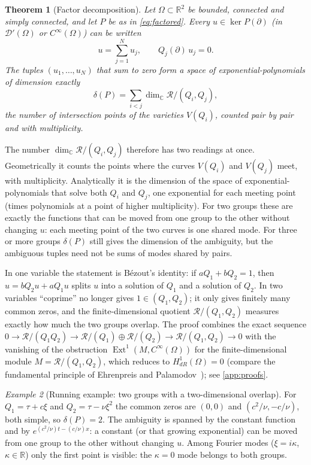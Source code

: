 \documentclass[11pt]{article}
\theoremstyle{plain}
\newtheorem{theorem}{Theorem}[section]
\theoremstyle{definition}
\theoremstyle{remark}
\newtheorem{example}[theorem]{Example}
\newcommand{\R}{\mathbb{R}}
\newcommand{\C}{\mathbb{C}}
\newcommand{\ring}{\mathcal{R}}            %
\newcommand{\Var}{V}                        %
\newcommand{\deltaP}{\delta(P)}             %
\begin{document}
\begin{theorem}[Factor decomposition]\label{thm:factor}
Let $\Omega\subset\R^2$ be bounded, connected and simply connected, and let $P$ be as in
\eqref{eq:factored}. Every $u\in\ker P(\partial)$ (in $\mathcal D'(\Omega)$ or $C^\infty(\Omega)$) can be
written
\begin{equation}\label{eq:decomp}
  u=\sum_{j=1}^N u_j,\qquad Q_j(\partial)\,u_j=0 .
\end{equation}
The tuples $(u_1,\dots,u_N)$ that sum to zero form a space of exponential-polynomials of dimension
exactly
\begin{equation}\label{eq:deltaP}
  \deltaP=\sum_{i<j}\dim_\C\ring/(Q_i,Q_j),
\end{equation}
the number of intersection points of the varieties $\Var(Q_i)$, counted pair by pair and with multiplicity.
\end{theorem}

The number $\dim_\C\ring/(Q_i,Q_j)$ therefore has two readings at once. Geometrically it counts the points where
the curves $\Var(Q_i)$ and $\Var(Q_j)$ meet, with multiplicity. Analytically it is the dimension of the space of
exponential-polynomials that solve both $Q_i$ and $Q_j$, one exponential for each meeting point (times polynomials at a
point of higher multiplicity). For two groups these are exactly the functions that can be moved from one group to the
other without changing $u$: each meeting point of the two curves is one shared mode. For three or more groups $\deltaP$
still gives the dimension of the ambiguity, but the ambiguous tuples need not be sums of modes shared by pairs.

In one variable the statement is B\'ezout's identity: if $aQ_1+bQ_2=1$, then
$u=bQ_2u+aQ_1u$ splits $u$ into a solution of $Q_1$ and a solution of $Q_2$. In two variables
``coprime'' no longer gives $1\in(Q_1,Q_2)$; it only gives finitely many common zeros, and the
finite-dimensional quotient $\ring/(Q_1,Q_2)$ measures exactly how much the two groups overlap. The
proof combines the exact sequence
$0\to\ring/(Q_1Q_2)\to\ring/(Q_1)\oplus\ring/(Q_2)\to\ring/(Q_1,Q_2)\to0$ with the vanishing of the obstruction
$\operatorname{Ext}^1(M,C^\infty(\Omega))$ for the finite-dimensional module $M=\ring/(Q_1,Q_2)$, which reduces to
$H^1_{dR}(\Omega)=0$ (compare the fundamental principle of Ehrenpreis and Palamodov~\cite{Ehr70,Pal70});
see \cref{app:proofs}.

\begin{example}[Running example: two groups with a two-dimensional overlap]\label{ex:tpd-factor}
For $Q_1=\tau+c\xi$ and $Q_2=\tau-\nu\xi^2$ the common zeros are $(0,0)$ and $(c^2/\nu,-c/\nu)$,
both simple, so $\deltaP=2$. The ambiguity is spanned by the constant function and by
$e^{(c^2/\nu)t-(c/\nu)x}$: a constant (or that growing exponential) can be moved from one group to
the other without changing $u$. Among Fourier modes ($\xi=i\kappa$, $\kappa\in\R$) only the
first point is visible: the $\kappa=0$ mode belongs to both groups.
\end{example}
\end{document}
